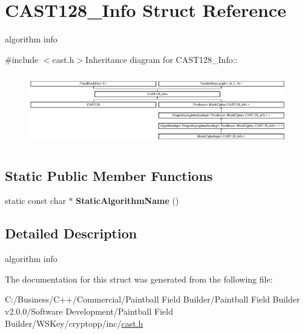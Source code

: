 \hypertarget{struct_c_a_s_t128___info}{
\section{CAST128\_\-Info Struct Reference}
\label{struct_c_a_s_t128___info}
}


algorithm info  


{\ttfamily \#include $<$cast.h$>$}Inheritance diagram for CAST128\_\-Info::\begin{figure}[H]
\begin{center}
\leavevmode
\includegraphics[height=3.15789cm]{struct_c_a_s_t128___info}
\end{center}
\end{figure}
\subsection*{Static Public Member Functions}
\begin{DoxyCompactItemize}
\item 
\hypertarget{struct_c_a_s_t128___info_ace3f7a10c636fb1f300cbba4b30da785}{
static const char $\ast$ {\bfseries StaticAlgorithmName} ()}
\label{struct_c_a_s_t128___info_ace3f7a10c636fb1f300cbba4b30da785}

\end{DoxyCompactItemize}


\subsection{Detailed Description}
algorithm info 

The documentation for this struct was generated from the following file:\begin{DoxyCompactItemize}
\item 
C:/Business/C++/Commercial/Paintball Field Builder/Paintball Field Builder v2.0.0/Software Development/Paintball Field Builder/WSKey/cryptopp/inc/\hyperlink{cast_8h}{cast.h}\end{DoxyCompactItemize}
